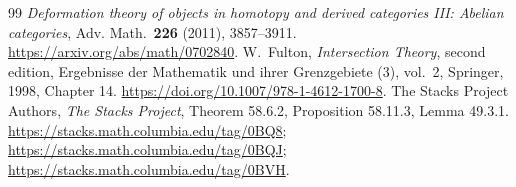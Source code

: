 \begin{thebibliography}{99}
\emph{Deformation theory of objects in homotopy and derived categories III: Abelian categories},
Adv. Math.\ \textbf{226} (2011), 3857--3911.
\url{https://arxiv.org/abs/math/0702840}.
W.~Fulton, \emph{Intersection Theory}, second edition,
Ergebnisse der Mathematik und ihrer Grenzgebiete (3), vol.~2,
Springer, 1998, Chapter 14.
\url{https://doi.org/10.1007/978-1-4612-1700-8}.
The Stacks Project Authors,
\emph{The Stacks Project},
Theorem 58.6.2, Proposition 58.11.3, Lemma 49.3.1.
\url{https://stacks.math.columbia.edu/tag/0BQ8};
\url{https://stacks.math.columbia.edu/tag/0BQJ};
\url{https://stacks.math.columbia.edu/tag/0BVH}.
\end{thebibliography}

